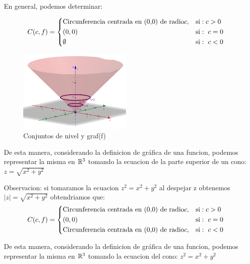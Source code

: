 \begin{definition} 
En general, podemos determinar: 

   \[
        C(c,f)=
        \begin{dcases}
           \textnormal{Circunferencia centrada en (0,0) de radio} c,  & \textnormal{si}:  c>0 \\
(0,0)  & \textnormal{si}:\ c=0\\
\emptyset  & \textnormal{si}:\ c<0\\
        \end{dcases}
    \]
\begin{figure}[h!] %
    \centering
    \includegraphics[width=0.5\textwidth]{../figs/conjunto2_r3.png} %
    \caption{Conjuntos de nivel y graf(f)}
    \label{fig:ejemplo} %
\end{figure}

De esta manera, considerando la definicion de gráfica de una funcion, podemos representar la misma en $\mathbb{R}^3$ tomando  la ecuacion de la parte superior de un cono: $z=\sqrt{x^2+y^2}$


Observacion: si tomaramos la ecuacion $z^2=x^2+y^2$ al despejar z obtenemos $|z|=\sqrt{x^2+y^2}$ obtendriamos que: 
 \[
        C(c,f)=
        \begin{dcases}
           \textnormal{Circunferencia centrada en (0,0) de radio} c,  & \textnormal{si}:  c>0 \\
(0,0)  & \textnormal{si}:\ c=0\\
\textnormal{Circunferencia centrada en (0,0) de radio} c,  & \textnormal{si}:\ c<0\\
        \end{dcases}
    \]

De esta manera, considerando la definicion de gráfica de una funcion, podemos representar la misma en $\mathbb{R}^3$ tomando  la ecuacion del cono: $z^2=x^2+y^2$


\end{definition}
